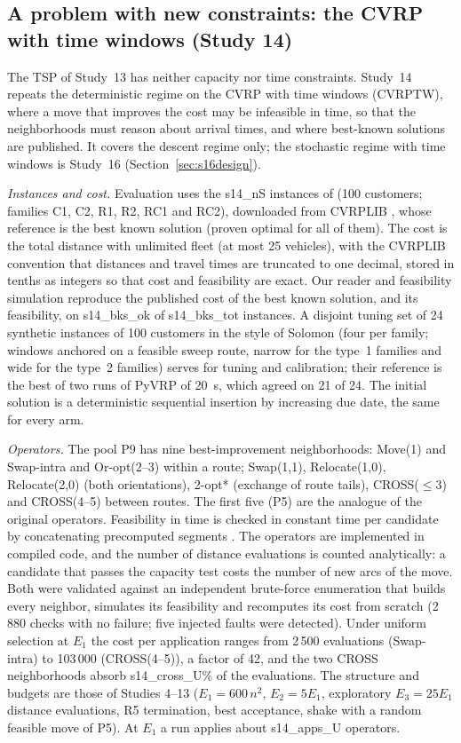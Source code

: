 \subsection{A problem with new constraints: the CVRP with time windows (Study 14)}\label{sec:s14design}
The TSP of Study~13 has neither capacity nor time constraints. Study~14 repeats the deterministic regime on the CVRP with time windows (CVRPTW), where a move that improves the cost may be infeasible in time, so that the neighborhoods must reason about arrival times, and where best-known solutions are published. It covers the descent regime only; the stochastic regime with time windows is Study~16 (Section~\ref{sec:s16design}).

\emph{Instances and cost.} Evaluation uses the \num{s14_nS} instances of \citet{solomon1987} (100 customers; families C1, C2, R1, R2, RC1 and RC2), downloaded from CVRPLIB \citep{cvrplib}, whose reference is the best known solution (proven optimal for all of them). The cost is the total distance with unlimited fleet (at most 25 vehicles), with the CVRPLIB convention that distances and travel times are truncated to one decimal, stored in tenths as integers so that cost and feasibility are exact. Our reader and feasibility simulation reproduce the published cost of the best known solution, and its feasibility, on \num{s14_bks_ok} of \num{s14_bks_tot} instances. A disjoint tuning set of 24 synthetic instances of 100 customers in the style of Solomon (four per family; windows anchored on a feasible sweep route, narrow for the type~1 families and wide for the type~2 families) serves for tuning and calibration; their reference is the best of two runs of PyVRP \citep{wouda2024} of 20~s, which agreed on 21 of 24. The initial solution is a deterministic sequential insertion by increasing due date, the same for every arm.

\emph{Operators.} The pool P9 has nine best-improvement neighborhoods: Move(1) and Swap-intra and Or-opt(2--3) within a route; Swap(1,1), Relocate(1,0), Relocate(2,0) (both orientations), 2-opt* (exchange of route tails), CROSS($\le3$) and CROSS(4--5) between routes. The first five (P5) are the analogue of the original operators. Feasibility in time is checked in constant time per candidate by concatenating precomputed segments \citep{vidal2013}. The operators are implemented in compiled code, and the number of distance evaluations is counted analytically: a candidate that passes the capacity test costs the number of new arcs of the move. Both were validated against an independent brute-force enumeration that builds every neighbor, simulates its feasibility and recomputes its cost from scratch (2\,880 checks with no failure; five injected faults were detected). Under uniform selection at $E_1$ the cost per application ranges from 2\,500 evaluations (Swap-intra) to 103\,000 (CROSS(4--5)), a factor of 42, and the two CROSS neighborhoods absorb \num{s14_cross_U}\% of the evaluations. The structure and budgets are those of Studies 4--13 ($E_1=600\,n^2$, $E_2=5E_1$, exploratory $E_3=25E_1$ distance evaluations, R5 termination, best acceptance, shake with a random feasible move of P5). At $E_1$ a run applies about \num{s14_apps_U} operators.

